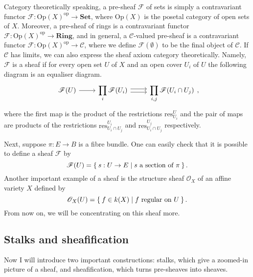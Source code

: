 \begin{cat}
  Category theoretically speaking, a pre-sheaf $\mathscr{F}$ of sets is
  simply a contravariant functor $\mathscr{F}:\text{Op}(X)^{\text{op}}
  \to\mathbf{Set}$, where $\text{Op}(X)$ is the posetal category of
  open sets of $X$. Moreover, a pre-sheaf of rings is a contravariant functor
  $\mathscr{F}:\text{Op}(X)^{\text{op}}\to \mathbf{Ring}$, and in general,
  a $\mathscr{C}$-valued pre-sheaf is a contravariant functor
  $\mathscr{F}:\text{Op}(X)^{\text{op}}\to\mathscr{C}$, where we define
  $\mathscr{F}(\emptyset)$ to be the final object of $\mathscr{C}$.
  If $\mathscr{C}$ has limits, we can also express the sheaf axiom category
  theoretically. Namely, $\mathscr{F}$ is a sheaf if for every
  open set $U$ of $X$ and an open cover $U_{i}$ of $U$ the following
  diagram is an equaliser diagram.
  \begin{equation}\label{diag:sheaf_eq}\begin{tikzcd}
      \mathscr{F}(U)\rar
      & \displaystyle\prod_{i}\mathscr{F}(U_{i})\rar[shift left]\rar[shift right]
      & \displaystyle\prod_{i,j}\mathscr{F}(U_{i}\cap U_{j})
    \end{tikzcd},\end{equation}
  where the first map is the product of the restrictions
  $\text{res}_{U_{i}}^{U}$ and the pair of maps are products of the
  restrictions $\text{res}_{U_{i}\cap U_{j}}^{U_{i}}$ and
  $\text{res}_{U_{i}\cap U_{j}}^{U_{j}}$ respectively.
\end{cat}

Next, suppose $\pi: E\to B$ is a fibre bundle. One can easily check that
it is possible to define a sheaf $\mathscr{F}$ by
\[
  \mathscr{F}(U) = \Set{s:U\to E\mid s\text{ a section of }\pi}.
\]
Another important example of a sheaf is the structure sheaf $\mathscr{O}_{X}$
of an affine variety $X$ defined by
\[
  \mathscr{O}_{X}(U)=\Set{f\in k(X)\mid f\text{ regular on } U}.
\]
From now on, we will be concentrating on this sheaf more.

\subsection{Stalks and sheafification}
Now I will introduce two important constructions: stalks, which give a
zoomed-in picture of a sheaf, and sheafification, which turns pre-sheaves
into sheaves.

